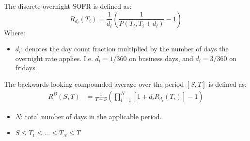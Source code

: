 \newpage 

\begin{definition}
The discrete overnight SOFR is defined as:
\[
R_{d_{i}}(T_{i}) = \frac{1}{d_{i}}\left(
\frac{1}{P(T_{i}, T_{i}+d_{i})} - 1
\right)
\]
Where:
\begin{itemize}[leftmargin=*]
    \item $d_{i}$: denotes the day count fraction multiplied by the number of days the overnight rate applies. I.e. $d_{i} = 1/360$ on business days, and $d_{i} = 3/360$ on fridays. 
\end{itemize}
\end{definition}

\begin{definition}
\label{def: backward_looking_SOFR_avg}
The backwards-looking compounded average over the period $[S,T]$ is defined as: 
\begin{align*}
R^{B}(S,T) &= \frac{1}{T-S}\left(
\prod_{i=1}^{N}[1+d_{i}R_{d_{i}}(T_{i})] - 1
\right)    
\end{align*}
\begin{itemize}[leftmargin=*]
    \item $N$: total number of days in the applicable period.
    \item $S\leq T_{1} \leq \dots \leq T_{N} \leq T$ 
\end{itemize}
\end{definition}

